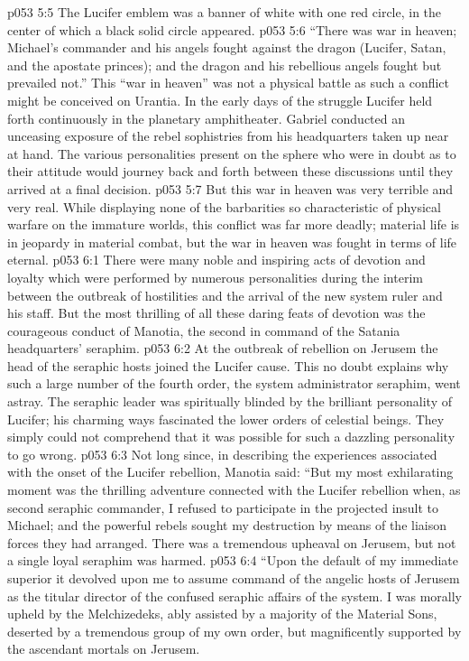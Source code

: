 \vs p053 5:5 The Lucifer emblem was a banner of white with one red circle, in the center of which a black solid circle appeared.
\vs p053 5:6 “There was war in heaven; Michael’s commander and his angels fought against the dragon (Lucifer, Satan, and the apostate princes); and the dragon and his rebellious angels fought but prevailed not.” This “war in heaven” was not a physical battle as such a conflict might be conceived on Urantia. In the early days of the struggle Lucifer held forth continuously in the planetary amphitheater. Gabriel conducted an unceasing exposure of the rebel sophistries from his headquarters taken up near at hand. The various personalities present on the sphere who were in doubt as to their attitude would journey back and forth between these discussions until they arrived at a final decision.
\vs p053 5:7 But this war in heaven was very terrible and very real. While displaying none of the barbarities so characteristic of physical warfare on the immature worlds, this conflict was far more deadly; material life is in jeopardy in material combat, but the war in heaven was fought in terms of life eternal.
\vs p053 6:1 There were many noble and inspiring acts of devotion and loyalty which were performed by numerous personalities during the interim between the outbreak of hostilities and the arrival of the new system ruler and his staff. But the most thrilling of all these daring feats of devotion was the courageous conduct of Manotia, the second in command of the Satania headquarters’ seraphim.
\vs p053 6:2 At the outbreak of rebellion on Jerusem the head of the seraphic hosts joined the Lucifer cause. This no doubt explains why such a large number of the fourth order, the system administrator seraphim, went astray. The seraphic leader was spiritually blinded by the brilliant personality of Lucifer; his charming ways fascinated the lower orders of celestial beings. They simply could not comprehend that it was possible for such a dazzling personality to go wrong.
\vs p053 6:3 \pc Not long since, in describing the experiences associated with the onset of the Lucifer rebellion, Manotia said: “But my most exhilarating moment was the thrilling adventure connected with the Lucifer rebellion when, as second seraphic commander, I refused to participate in the projected insult to Michael; and the powerful rebels sought my destruction by means of the liaison forces they had arranged. There was a tremendous upheaval on Jerusem, but not a single loyal seraphim was harmed.
\vs p053 6:4 “Upon the default of my immediate superior it devolved upon me to assume command of the angelic hosts of Jerusem as the titular director of the confused seraphic affairs of the system. I was morally upheld by the Melchizedeks, ably assisted by a majority of the Material Sons, deserted by a tremendous group of my own order, but magnificently supported by the ascendant mortals on Jerusem.
